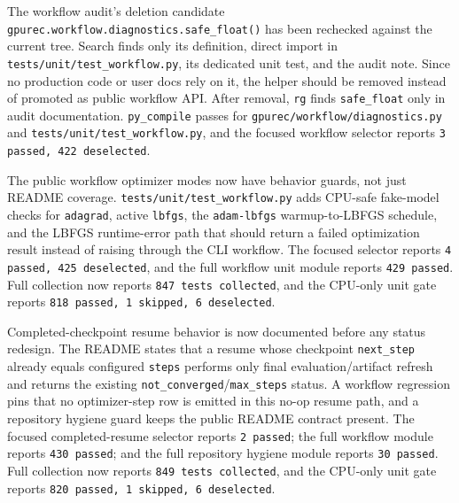 \documentclass[11pt]{article}
\begin{document}
The workflow audit's deletion candidate
\texttt{gpurec.workflow.diagnostics.safe\_float()} has been rechecked against
the current tree.  Search finds only its definition, direct import in
\texttt{tests/unit/test\_workflow.py}, its dedicated unit test, and the audit
note.  Since no production code or user docs rely on it, the helper should be
removed instead of promoted as public workflow API.
After removal, \texttt{rg} finds \texttt{safe\_float} only in audit
documentation.  \texttt{py\_compile} passes for
\texttt{gpurec/workflow/diagnostics.py} and
\texttt{tests/unit/test\_workflow.py}, and the focused workflow selector reports
\texttt{3 passed, 422 deselected}.

The public workflow optimizer modes now have behavior guards, not just README
coverage.  \texttt{tests/unit/test\_workflow.py} adds CPU-safe fake-model
checks for \texttt{adagrad}, active \texttt{lbfgs}, the
\texttt{adam-lbfgs} warmup-to-LBFGS schedule, and the LBFGS runtime-error path
that should return a failed optimization result instead of raising through the
CLI workflow.  The focused selector reports
\texttt{4 passed, 425 deselected}, and the full workflow unit module reports
\texttt{429 passed}.  Full collection now reports \texttt{847 tests
collected}, and the CPU-only unit gate reports
\texttt{818 passed, 1 skipped, 6 deselected}.

Completed-checkpoint resume behavior is now documented before any status
redesign.  The README states that a resume whose checkpoint \texttt{next\_step}
already equals configured \texttt{steps} performs only final
evaluation/artifact refresh and returns the existing
\texttt{not\_converged}/\texttt{max\_steps} status.  A workflow regression pins
that no optimizer-step row is emitted in this no-op resume path, and a
repository hygiene guard keeps the public README contract present.  The focused
completed-resume selector reports \texttt{2 passed}; the full workflow module
reports \texttt{430 passed}; and the full repository hygiene module reports
\texttt{30 passed}.  Full collection now reports \texttt{849 tests collected},
and the CPU-only unit gate reports
\texttt{820 passed, 1 skipped, 6 deselected}.
\end{document}
